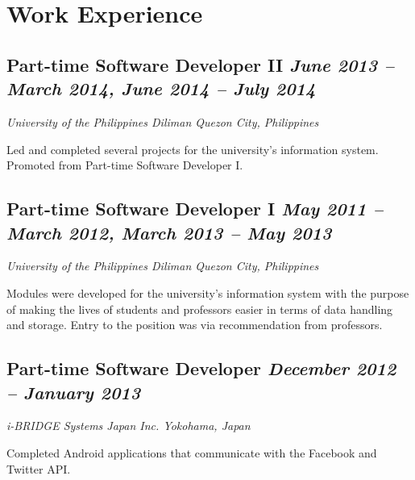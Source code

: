 \section*{Work Experience}

\subsection*{{\color{special-color}Part-time Software Developer II \hfill \textnormal{\emph{June 2013 -- March 2014, June 2014 -- July 2014}}}}
\begin{description}
  \item[\faSuitcase] \emph{University of the Philippines Diliman \hfill {\color{gray}Quezon City, Philippines}}
  \item Led and completed several projects for the university's information system. Promoted from Part-time Software Developer I.
\end{description}

\subsection*{{\color{special-color}Part-time Software Developer I \hfill \textnormal{\emph{May 2011 -- March 2012, March 2013 -- May 2013}}}}
\begin{description}
  \item[\faSuitcase] \emph{University of the Philippines Diliman \hfill {\color{gray}Quezon City, Philippines}}
  \item Modules were developed for the university's information system with the purpose of making the lives of students and professors easier in terms of data handling and storage. Entry to the position was via recommendation from professors.
\end{description}

\subsection*{{\color{special-color}Part-time Software Developer \hfill \textnormal{\emph{December 2012 -- January 2013}}}}
\begin{description}
  \item[\faSuitcase] \emph{i-BRIDGE Systems Japan Inc. \hfill {\color{gray}Yokohama, Japan}}
  \item Completed Android applications that communicate with the Facebook and Twitter API.
\end{description}

